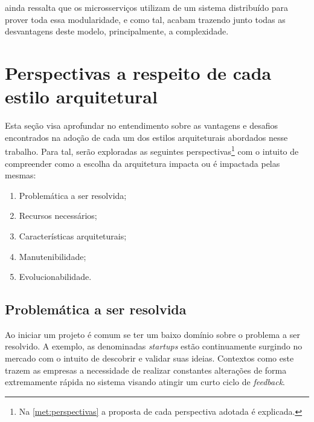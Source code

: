  ainda ressalta que os microsserviços utilizam de um sistema
distribuído para prover toda essa modularidade, e como tal, acabam trazendo junto todas as
desvantagens deste modelo, principalmente, a complexidade.


\section{Perspectivas a respeito de cada estilo arquitetural}
\label{perspectivas}

Esta seção visa aprofundar no entendimento sobre as vantagens e desafios encontrados na adoção
de cada um dos estilos arquiteturais abordados nesse trabalho. Para tal, serão exploradas as seguintes
perspectivas\footnote{Na \autoref{met:perspectivas} a proposta de cada perspectiva adotada é explicada.}
com o intuito de compreender como a escolha da arquitetura impacta ou é impactada pelas
mesmas:

\begin{enumerate}
    \item Problemática a ser resolvida;
    \item Recursos necessários;
    \item Características arquiteturais;
    \item Manutenibilidade;
    \item Evolucionabilidade.
\end{enumerate}

\subsection{Problemática a ser resolvida}
\label{Perspectivas:Problematica}

Ao iniciar um projeto é comum se ter um baixo domínio sobre o problema a ser resolvido. A exemplo,
as denominadas \textit{startups} estão continuamente surgindo no mercado com o intuito de descobrir
e validar suas ideias. Contextos como este trazem as empresas a necessidade de realizar constantes
alterações de forma extremamente rápida no sistema visando atingir um curto ciclo de
\textit{feedback}.

